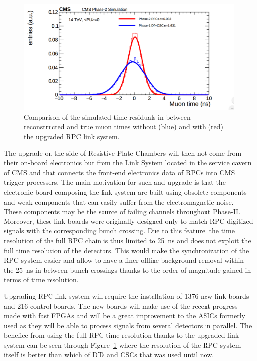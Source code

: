 	\begin{figure}[H]
		\centering
		\includegraphics[width=\plotwidth]{fig/chapt3/RPC-ugrade-LS.png}
		\caption{\label{fig:RPC-time} Comparison of the simulated time residuals in between reconstructed and true muon times without (blue) and with (red) the upgraded RPC link system.}
	\end{figure}
	
	The upgrade on the side of Resistive Plate Chambers will then not come from their on-board electronics but from the Link System located in the service cavern of CMS and that connects the front-end electronics data of RPCs into CMS trigger processors. The main motivation for such and upgrade is that the electronic board composing the link system are built using obsolete components and weak components that can easily suffer from the electromagnetic noise. These components may be the source of failing channels throughout Phase-II. Moreover, these link boards were originally designed only to match RPC digitized signals with the corresponding bunch crossing. Due to this feature, the time resolution of the full RPC chain is thus limited to \SI{25}{ns} and does not exploit the full time resolution of the detectors. This would make the synchronization of the RPC system easier and allow to have a finer offline background removal within the \SI{25}{ns} in between bunch crossings thanks to the order of magnitude gained in terms of time resolution.
	
	Upgrading RPC link system will require the installation of 1376 new link boards and 216 control boards. The new boards will make use of the recent progress made with fast FPGAs and will be a great improvement to the ASICs formerly used as they will be able to process signals from several detectors in parallel. The benefice from using the full RPC time resolution thanks to the upgraded link system can be seen through Figure~\ref{fig:RPC-time} where the resolution of the RPC system itself is better than which of DTs and CSCs that was used until now.

